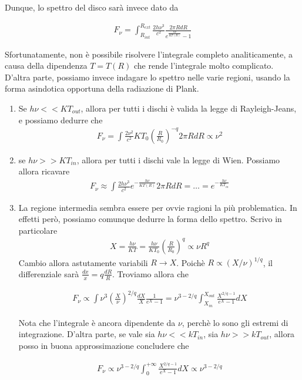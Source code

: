 \documentclass{report}
\begin{document}
Dunque, lo spettro del disco sarà invece dato da 

\begin{align}
    F_\nu = \int_{R_{int}}^{R_{ext}} \frac{2h \nu^3}{c^2}\frac{2\pi RdR}{e^{\frac{h\nu}{KT(R)}}-1}
\end{align}

Sfortunatamente, non è possibile risolvere l'integrale completo analiticamente, a causa della dipendenza \(T= T(R)\) che rende l'integrale molto complicato. D'altra parte, possiamo invece indagare lo spettro nelle varie regioni, usando la forma asindotica opportuna della radiazione di Plank. 

\begin{enumerate}
    \item Se \(h\nu << KT_{out}\), allora per tutti i dischi è valida la legge di Rayleigh-Jeans, e possiamo dedurre che 
    \begin{align}
        F_\nu = \int \frac{2\nu^2}{c^2}KT_0 \left(\frac{R}{R_0} \right)^{-q}2\pi R dR \propto \nu^2
    \end{align}
    \item se \(h\nu >> KT_{in}\), allora per tutti i dischi vale la legge di Wien. Possiamo allora ricavare
    \begin{align}
        F_\nu \approx \int \frac{2h \nu^3}{c^2}e^{-\frac{h\nu}{KT(R)}}2\pi R dR = \ldots = e^{-\frac{h\nu}{KT_{in}}}
    \end{align}
    \item La regione intermedia sembra essere per ovvie ragioni la più problematica. In effetti però, possiamo comunque dedurre la forma dello spettro. Scrivo in particolare 
    \begin{align}
        X = \frac{h\nu}{KT} = \frac{h\nu}{KT_0}\left(\frac{R}{R_0} \right)^{q} \propto \nu R^{q}
    \end{align}
    Cambio allora astutamente variabili \(R \rightarrow X\). Poichè \(R \propto (X/\nu)^{1/q}\), il differenziale sarà  \(\frac{dx}{x} = q\frac{dR}{R}\). Troviamo allora che 

    \begin{align}
        F_\nu \propto \int \nu^3 \left(\frac{X}{\nu} \right)^{2/q} \frac{dX}{X} \frac{1}{e^X -1} = \nu^{3-2/q}\int_{X_{in}}^{X_{out}}\frac{X^{2/q -1}}{e^X -1}dX
    \end{align}

    Nota che l'integrale è ancora dipendente da \(\nu\), perchè lo sono gli estremi di integrazione. D'altra parte, se vale sia \(h\nu << kT_{in}\), sia \(h\nu >> kT_{out}\), allora posso in buona approssimazione concludere che 

    \begin{align}
        F_\nu \propto \nu^{3-2/q}\int_{0}^{+\infty}\frac{X^{2/q -1}}{e^X -1}dX \propto \nu^{3-2/q}
    \end{align}
\end{enumerate}
\end{document}

